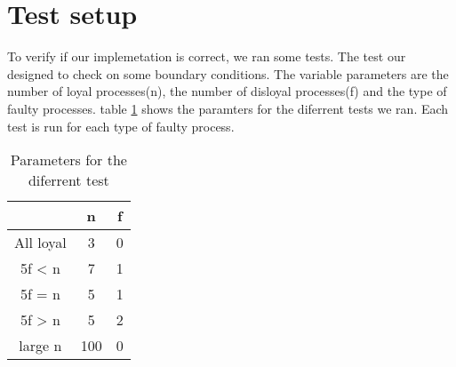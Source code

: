\section{Test setup}

To verify if our implemetation is correct, we ran some tests.
The test our designed to check on some boundary conditions.
The variable parameters are the number of loyal processes(n), the number of disloyal processes(f) and the type of faulty processes.
table \ref{table:Tests} shows the paramters for the diferrent tests we ran. Each test is run for each type of faulty process.

\begin{table}[h]
	\begin{tabular}{ | c | c  | c  | }
		\hline
  		& n & f \\
		\hline
 		All loyal &  3 & 0  \\
		\hline
  		5f < n  & 7 & 1  \\
		\hline
		5f = n & 5 & 1 \\
		\hline
		5f > n & 5 & 2 \\
		\hline
		large n  & 100 & 0 \\
		\hline
	\end{tabular}
	\caption{Parameters for the diferrent test}	
	\label{table:Tests}
\end{table}
